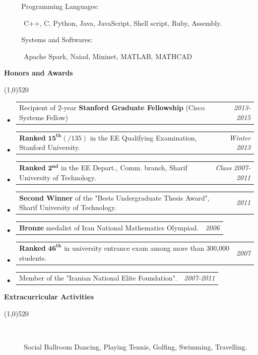 \documentclass[letterpaper,10pt]{article}
\makeatletter
\newcommand{\heading}[1] {
  {\large
    \begin{minipage}
    {\textwidth}
    {\textbf{#1}}
    \end{minipage}
  }
  \begin{center}
  \vspace{-15pt}
  \line(1,0){520}
  \end{center}
}
\newcommand{\template}[2]{
\begin{tabular*}{7.0in}{l@{\extracolsep{\fill}}r}
		#1 & \textit{#2} \\
\end{tabular*}\vspace{-1pt}}
\makeatother
\begin{document}
\begin{description}

\item[~~~~~Programming Languages:]
C++, C, Python, Java, JavaScript, Shell script, Ruby, Assembly.

\item[~~~~~Systems and Softwares:]
Apache Spark, Naiad, Mininet, MATLAB, MATHCAD

\end{description}





\heading{Honors and Awards}

\begin{itemize}

\item  \template{Recipient of 2-year \textbf {Stanford Graduate Fellowship} (Cisco Systems Fellow)}{2013-2015}

\item  \template{\textbf{Ranked} $\mathbf{15^{th}}(/135)$ in the EE Qualifying Examination, Stanford University.}{Winter 2013}

\item  \template{\textbf{Ranked} $\mathbf{2^{nd}}$ in the EE Depart., Comm. branch, Sharif University of Technology.}{Class 2007-2011}

\item \template{ \textbf{Second Winner} of the "Bests Undergraduate Thesis Award", Sharif University of Technology.}{2011}

\item \template{\textbf{Bronze} medalist of Iran National Mathematics Olympiad.}{2006}

\item \template{\textbf{Ranked} $\mathbf{46^{th}}$ in university entrance exam among more than 300,000 students.}{2007}

\item \template{Member of the "Iranian National Elite Foundation".}{2007-2011} 

\end{itemize}





\heading{Extracurricular Activities}

\begin{description}

\item[~~~~~] Social Ballroom Dancing, Playing Tennis, Golfing, Swimming, Travelling.

\end{description}
\end{document}
